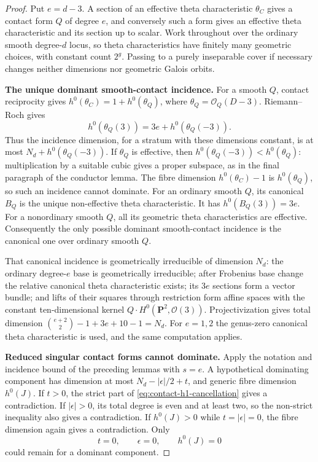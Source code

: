 \begin{proof}
Put $e=d-3$.  A section of an effective theta characteristic
$\theta_C$ gives a contact form $Q$ of degree $e$, and conversely
such a form gives an effective theta characteristic and its
section up to scalar.  Work throughout over the ordinary smooth
degree-$d$ locus, so theta characteristics have finitely many
geometric choices, with constant count $2^g$.  Passing to a
purely inseparable cover if necessary changes neither dimensions
nor geometric Galois orbits.

\par\smallskip\noindent\textbf{The unique dominant smooth-contact incidence.}
For a smooth $Q$, contact reciprocity gives
$h^0(\theta_C)=1+h^0(\theta_Q)$, where
$\theta_Q=\mathcal O_Q(D-3)$.
Riemann--Roch gives
\[
 h^0(\theta_Q(3))=3e+h^0(\theta_Q(-3)).
\]
Thus the incidence dimension, for a stratum with these dimensions
constant, is at most $N_d+h^0(\theta_Q(-3))$.
If $\theta_Q$ is effective, then
$h^0(\theta_Q(-3))<h^0(\theta_Q)$: multiplication by a suitable
cubic gives a proper subspace, as in the final paragraph of the
conductor lemma.  The fibre dimension $h^0(\theta_C)-1$
is $h^0(\theta_Q)$, so such an incidence cannot dominate.
For an ordinary smooth $Q$, its canonical $B_Q$ is the unique
non-effective theta characteristic.  It has
$h^0(B_Q(3))=3e$.  For a nonordinary smooth $Q$, all its geometric
theta characteristics are effective.  Consequently the only
possible dominant smooth-contact incidence is the canonical one
over ordinary smooth $Q$.

That canonical incidence is geometrically irreducible of dimension
$N_d$: the ordinary degree-$e$ base is geometrically irreducible;
after Frobenius base change the relative canonical theta
characteristic exists; its $3e$ sections form a vector bundle;
and lifts of their squares through restriction form affine spaces
with the constant ten-dimensional kernel
$Q\cdot H^0(\mathbf P^2,\mathcal O(3))$.
Projectivization gives total dimension
$\binom{e+2}{2}-1+3e+10-1=N_d$.
For $e=1,2$ the genus-zero canonical theta characteristic is used,
and the same computation applies.

\par\smallskip\noindent\textbf{Reduced singular contact forms cannot dominate.}
Apply the notation and incidence bound of the preceding lemmas
with $s=e$.  A hypothetical dominating component has dimension
at most $N_d-|\epsilon|/2+t$, and generic fibre dimension
$h^0(J)$.  If $t>0$, the strict part of
\eqref{eq:contact-h1-cancellation} gives a contradiction.
If $|\epsilon|>0$, its total degree is even and at least two,
so the non-strict inequality also gives a contradiction.
If $h^0(J)>0$ while $t=|\epsilon|=0$, the fibre dimension again
gives a contradiction.  Only
\[
 t=0,\qquad \epsilon=0,\qquad h^0(J)=0
\]
could remain for a dominant component.


\end{proof}
